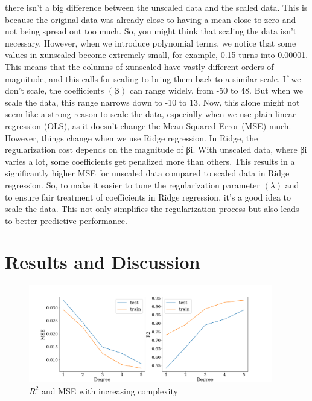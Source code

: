 \documentclass[twoside,11pt]{report}
\begin{document}
there isn't a big difference between the unscaled data and the scaled data. 
This is because the original data was already close to having a mean close to zero and not being spread out too much. 
So, you might think that scaling the data isn't necessary.
However, when we introduce polynomial terms, we notice that some values in xunscaled become extremely small, for example, 
0.15 turns into 0.00001. This means that the columns of xunscaled have vastly different orders of magnitude, and this calls 
for scaling to bring them back to a similar scale.
If we don't scale, the coefficients $(\boldsymbol{\beta})$ can range widely, from -50 to 48. But when we scale the data, this range narrows 
down to -10 to 13. Now, this alone might not seem like a strong reason to scale the data, especially when we use plain 
linear regression (OLS), as it doesn't change the Mean Squared Error (MSE) much.\\
However, things change when we use Ridge regression. In Ridge, the regularization cost depends on the magnitude of βi.
With unscaled data, where βi varies a lot, some coefficients get penalized more than others. This results in a 
significantly higher MSE for unscaled data compared to scaled data in Ridge regression.
So, to make it easier to tune the regularization parameter $(\lambda)$ and to ensure fair treatment of coefficients in Ridge regression, 
it's a good idea to scale the data. This not only simplifies the regularization process but also leads to better predictive performance.










\section{Results and Discussion}
\label{sec:resultsdiscussion}

\begin{figure}[!h]
    \begin{center}
        \includegraphics[width=0.95\textwidth]{../runsAndAdditions/R2andMSEOLS.png}
    \end{center}
    \caption{$R^2$ and MSE with increasing complexity}\label{fig:R2andMSEOLS}
\end{figure}
\end{document}
